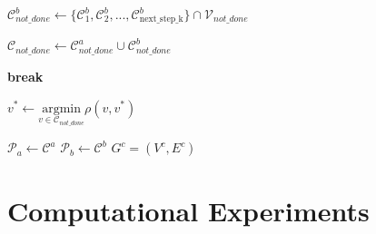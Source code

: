 \documentclass{article}
\begin{document}
\begin{algorithm}
\begin{algorithmic}[1]
        \State $\mathcal{C}^b_{not\_done} \gets \{\mathcal{C}^b_1, \mathcal{C}^b_2, ..., \mathcal{C}^b_{ \text{next\_step\_k} } \}  \cap \mathcal{V}_{not\_done}$
        
        
        \State $\mathcal{C}_{not\_done} \gets \mathcal{C}^a_{not\_done} \cup \mathcal{C}^b_{not\_done}$
        
            \State \textbf{break}
        \EndIf
        
        \State $v^* \gets \underset{v \in \mathcal{C}_{not\_done}}{\mathrm{argmin}} \rho(v, v^*)$
        
        \State $\mathcal{P}_a \gets \mathcal{C}^a$
        \State $\mathcal{P}_b \gets \mathcal{C}^b$
    \EndWhile
\EndWhile
\State \Return $G^c=(V^c,E^c)$
\end{algorithmic}
\end{algorithm}

\section{Computational Experiments}

\end{document}
